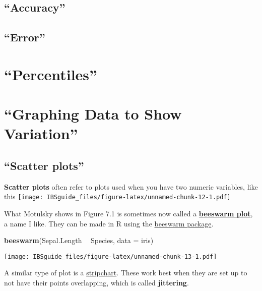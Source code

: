 \documentclass[]{book}
\newenvironment{Shaded}{\begin{snugshade}}{\end{snugshade}}
\newcommand{\KeywordTok}[1]{\textcolor[rgb]{0.13,0.29,0.53}{\textbf{#1}}}
\newcommand{\DataTypeTok}[1]{\textcolor[rgb]{0.13,0.29,0.53}{#1}}
\newcommand{\StringTok}[1]{\textcolor[rgb]{0.31,0.60,0.02}{#1}}
\newcommand{\OperatorTok}[1]{\textcolor[rgb]{0.81,0.36,0.00}{\textbf{#1}}}
\newcommand{\NormalTok}[1]{#1}
\theoremstyle{definition}
\theoremstyle{definition}
\theoremstyle{definition}
\theoremstyle{remark}
\begin{document}
\subsection{\texorpdfstring{``Accuracy''}{Accuracy}}\label{accuracy}

\subsection{\texorpdfstring{``Error''}{Error}}\label{error}

\section{\texorpdfstring{``Percentiles''}{Percentiles}}\label{percentiles}

\section{\texorpdfstring{``Graphing Data to Show
Variation''}{Graphing Data to Show Variation}}\label{graphing-data-to-show-variation}

\subsection{\texorpdfstring{``Scatter
plots''}{Scatter plots}}\label{scatter-plots}

\textbf{Scatter plots} often refer to plots used when you have two
numeric variables, like this
\texttt{[image: IBSguide\_files/figure-latex/unnamed-chunk-12-1.pdf]}

What Motulsky shows in Figure 7.1 is sometimes now called a
\href{https://flowingdata.com/2016/09/08/beeswarm-plot-in-r-to-show-distributions/}{\textbf{beeswarm
plot}}, a name I like. They can be made in R using the
\href{http://www.cbs.dtu.dk/~eklund/beeswarm/}{beeswarm package}.

\begin{Shaded}
\begin{Highlighting}[]
\KeywordTok{beeswarm}\NormalTok{(Sepal.Length }\OperatorTok{~}\StringTok{ }\NormalTok{Species, }
         \DataTypeTok{data =}\NormalTok{ iris)}
\end{Highlighting}
\end{Shaded}

\texttt{[image: IBSguide\_files/figure-latex/unnamed-chunk-13-1.pdf]}

A similar type of plot is a
\href{http://www.clayford.net/statistics/tag/strip-charts/}{stripchart}.
These work best when they are set up to not have their points
overlapping, which is called \textbf{jittering}.
\end{document}
